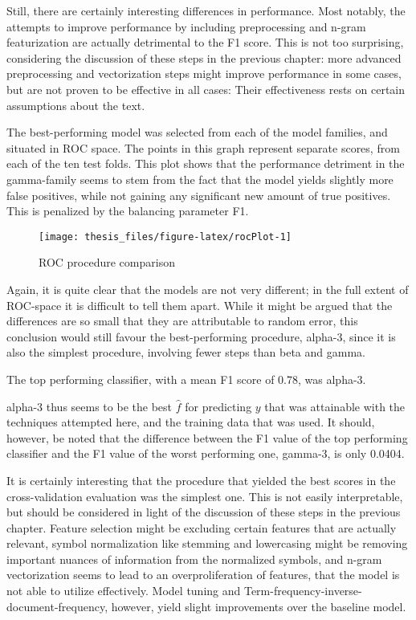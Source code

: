 \documentclass[12pt,twoside]{reedthesis}
\begin{document}
Still, there are certainly interesting differences in performance. Most
notably, the attempts to improve performance by including preprocessing
and n-gram featurization are actually detrimental to the F1 score. This
is not too surprising, considering the discussion of these steps in the
previous chapter: more advanced preprocessing and vectorization steps
might improve performance in some cases, but are not proven to be
effective in all cases: Their effectiveness rests on certain assumptions
about the text.

The best-performing model was selected from each of the model families,
and situated in ROC space. The points in this graph represent separate
scores, from each of the ten test folds. This plot shows that the
performance detriment in the gamma-family seems to stem from the fact
that the model yields slightly more false positives, while not gaining
any significant new amount of true positives. This is penalized by the
balancing parameter F1.
\begin{figure}

\texttt{[image: thesis\_files/figure-latex/rocPlot-1]} \hfill{}

\caption{ROC procedure comparison}\label{fig:rocPlot}
\end{figure}
Again, it is quite clear that the models are not very different; in the
full extent of ROC-space it is difficult to tell them apart. While it
might be argued that the differences are so small that they are
attributable to random error, this conclusion would still favour the
best-performing procedure, alpha-3, since it is also the simplest
procedure, involving fewer steps than beta and gamma.

The top performing classifier, with a mean F1 score of 0.78, was
alpha-3.

alpha-3 thus seems to be the best \(\hat{f}\) for predicting \(y\) that
was attainable with the techniques attempted here, and the training data
that was used. It should, however, be noted that the difference between
the F1 value of the top performing classifier and the F1 value of the
worst performing one, gamma-3, is only 0.0404.

It is certainly interesting that the procedure that yielded the best
scores in the cross-validation evaluation was the simplest one. This is
not easily interpretable, but should be considered in light of the
discussion of these steps in the previous chapter. Feature selection
might be excluding certain features that are actually relevant, symbol
normalization like stemming and lowercasing might be removing important
nuances of information from the normalized symbols, and n-gram
vectorization seems to lead to an overproliferation of features, that
the model is not able to utilize effectively. Model tuning and
Term-frequency-inverse-document-frequency, however, yield slight
improvements over the baseline model.
\end{document}
